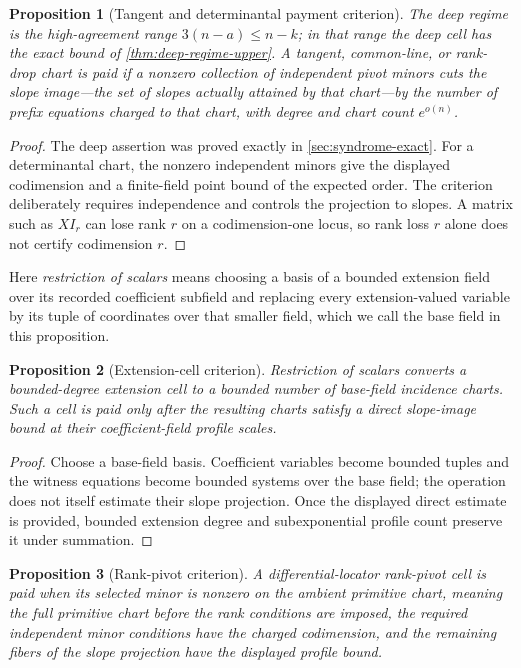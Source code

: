 \documentclass[12pt,a4paper]{amsart}
\numberwithin{equation}{section}
\newtheorem{proposition}[proposition]{Proposition}
\theoremstyle{remark}
\begin{document}
\begin{proposition}[Tangent and determinantal payment criterion]
\label{prop:tangent-payment}
The \emph{deep regime} is the high-agreement range
\(3(n-a)\le n-k\); in that range the deep cell has the exact bound of
\cref{thm:deep-regime-upper}.  A
tangent, common-line, or rank-drop chart is paid if a nonzero collection of
independent pivot minors cuts the \emph{slope image}---the set of slopes
actually attained by that chart---by the number of
prefix equations charged to that chart, with degree and chart count
\(e^{o(n)}\).
\end{proposition}

\begin{proof}
The deep assertion was proved exactly in \cref{sec:syndrome-exact}.  For a
determinantal chart, the nonzero independent minors give the displayed
codimension and a finite-field point bound of the expected order.  The
criterion deliberately requires independence and controls the projection
to slopes.  A matrix such as \(X I_r\) can lose rank \(r\) on a
codimension-one locus, so rank loss \(r\) alone does not certify codimension
\(r\).
\end{proof}

Here \emph{restriction of scalars} means choosing a basis of a bounded
extension field over its recorded coefficient subfield and replacing every
extension-valued variable by its tuple of coordinates over that smaller
field, which we call the base field in this proposition.

\begin{proposition}[Extension-cell criterion]\label{prop:extension-payment}
Restriction of scalars converts a bounded-degree extension cell to a
bounded number of base-field incidence charts.  Such a cell is paid only
after the resulting charts satisfy a direct slope-image bound at their
coefficient-field profile scales.
\end{proposition}

\begin{proof}
Choose a base-field basis.  Coefficient variables become bounded tuples and
the witness equations become bounded systems over the base field; the
operation does not itself estimate their slope projection.  Once the
displayed direct estimate is provided, bounded extension degree and
subexponential profile count preserve it under summation.
\end{proof}

\begin{proposition}[Rank-pivot criterion]\label{prop:rank-pivot-payment}
A differential-locator rank-pivot cell is paid when its selected
minor is nonzero on the \emph{ambient primitive chart}, meaning the full
primitive chart before the rank conditions are imposed, the required independent
minor conditions have the charged codimension, and the remaining fibers of
the slope projection have the displayed profile bound.
\end{proposition}
\end{document}
